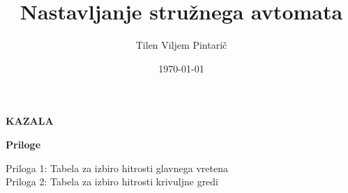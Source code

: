 \documentclass[a4paper, 12pt, fleqn]{article}
\title{Nastavljanje stružnega avtomata}
\author{Tilen Viljem Pintarič}
\date{\today}
\begin{document}


\newpage\null\thispagestyle{empty}\newpage




\pagestyle{fancy}
\fancyhf{}
\renewcommand{\headrulewidth}{0pt}
\fancyfoot[R]{\fontsize{12}{18} \thepage}



\newpage
\textbf{\fontsize{14}{21}\selectfont KAZALA}
\tableofcontents
\vspace*{0.5cm}

\listoffigures
\vspace*{0.5cm}

\listoftables
\vspace*{0.5cm}

\textbf{\fontsize{14}{21}\selectfont Priloge}

Priloga 1: Tabela za izbiro hitrosti glavnega vretena \\
Priloga 2: Tabela za izbiro hitrosti krivuljne gredi

\newpage
\end{document}
